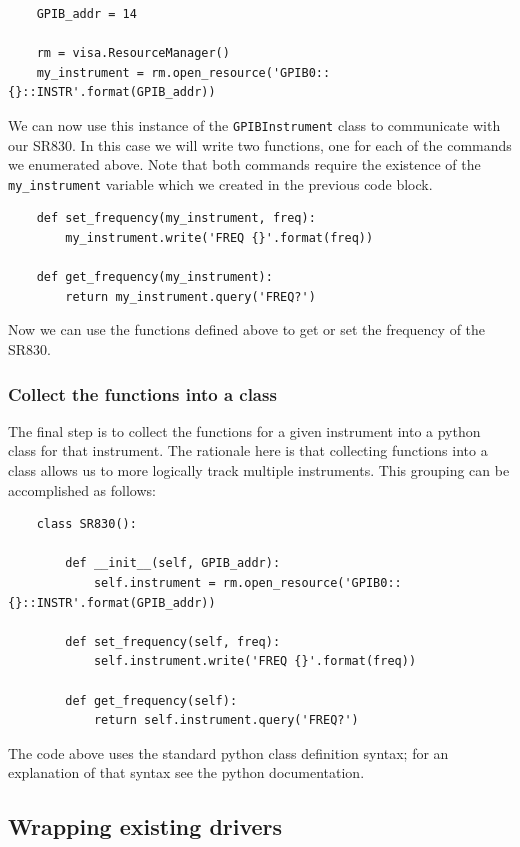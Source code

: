 \documentclass[edeposit,fullpage,draftthesis]{uiucthesis2009}
\begin{document}
\begin{appendices}
\begin{verbatim}
    GPIB_addr = 14
    
    rm = visa.ResourceManager()
    my_instrument = rm.open_resource('GPIB0::{}::INSTR'.format(GPIB_addr))
    \end{verbatim}
    We can now use this instance of the \texttt{GPIBInstrument} class to communicate with our SR830.
    In this case we will write two functions, one for each of the commands we enumerated above.
    Note that both commands require the existence of the \texttt{my\_instrument} variable which
    we created in the previous code block.
    \pagebreak
    \begin{verbatim}
    def set_frequency(my_instrument, freq):
        my_instrument.write('FREQ {}'.format(freq))
        
    def get_frequency(my_instrument):
        return my_instrument.query('FREQ?')
    \end{verbatim}
    Now we can use the functions defined above to get or set the frequency of the SR830.
    
    \subsubsection*{Collect the functions into a class}
    
    The final step is to collect the functions for a given instrument into a python class for that instrument.
    The rationale here is that collecting functions into a class allows us to more logically track multiple
    instruments. This grouping can be accomplished as follows:
    \begin{verbatim}
    class SR830():
    
        def __init__(self, GPIB_addr):
            self.instrument = rm.open_resource('GPIB0::{}::INSTR'.format(GPIB_addr))
            
        def set_frequency(self, freq):
            self.instrument.write('FREQ {}'.format(freq))
            
        def get_frequency(self):
            return self.instrument.query('FREQ?')
    \end{verbatim}
    The code above uses the standard python class definition syntax; for an explanation of that syntax see
    the python documentation.
    
    
    \subsection{Wrapping existing drivers}
    

\end{appendices}
\end{document}
